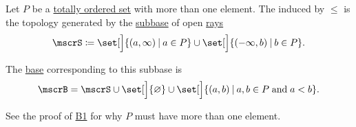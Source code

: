 \begin{definition}\label{def:order_topology}
  Let \( P \) be a \hyperref[def:partially_ordered_set]{totally ordered set} with more than one element. The  induced by \( \leq \) is the topology generated by the \hyperref[def:topological_subbase]{subbase} of open \hyperref[def:partially_ordered_set_interval/ray]{rays}
  \begin{equation}\label{eq:def:order_topology/subbase}
    \mscrS \coloneqq \set[\Big]{ (a, \infty) \given a \in P } \cup \set[\Big]{ (-\infty, b) \given b \in P }.
  \end{equation}

  The \hyperref[def:topological_base]{base} corresponding to this subbase is
  \begin{equation}\label{eq:def:order_topology/base}
    \mscrB = \mscrS \cup \set[\Big]{ \varnothing } \cup \set[\Big]{ (a, b) \given a, b \in P \T{and} a < b }.
  \end{equation}

  See the proof of \hyperref[thm:topology_from_base/B1]{B1} for why \( P \) must have more than one element.
\end{definition}
